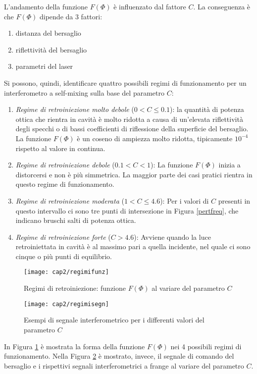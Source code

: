 L'andamento della funzione $F(\Phi)$ è influenzato dal fattore $C$. La conseguenza è che $F(\Phi)$  dipende da 3 fattori:
\begin{enumerate}
	\item distanza del bersaglio
	\item riflettività del bersaglio 
	\item parametri del laser
\end{enumerate}
Si possono, quindi, identificare quattro possibili regimi di funzionamento per un interferometro a self-mixing sulla base del parametro $C$:
\begin{enumerate}
	\item \textit{Regime di retroiniezione molto debole} ($0 < C \leq 0.1$): la quantità di potenza ottica che rientra in cavità è molto ridotta a causa di un'elevata riflettività degli specchi o di bassi coefficienti di riflessione della superficie del bersaglio. La funzione $F(\Phi)$ è un coseno di ampiezza molto ridotta, tipicamente $10^{-4}$ rispetto al valore in continua.
	\item \textit{Regime di retroiniezione debole} ($0.1 < C < 1$): La funzione $F(\Phi)$ inizia a distorcersi e non è più simmetrica. La maggior parte dei casi pratici rientra in questo regime di funzionamento. 
	\item \textit{Regime di retroiniezione moderata} ($1 < C \leq 4.6$): Per i valori di $C$ presenti in questo intervallo ci sono tre punti di intersezione in Figura \ref{pertfreq}, che indicano bruschi salti di potenza ottica.
	\item \textit{Regime di retroiniezione forte} ($C>4.6$): Avviene quando la luce retroiniettata in cavità è al massimo pari a quella incidente, nel quale ci sono cinque o più punti di equilibrio.
\end{enumerate}
\begin{figure}  
  \begin{center}
    \texttt{[image: cap2/regimifunz]}
    \caption{Regimi di retroiniezione: funzione $F(\Phi)$ al variare del parametro $C$}
    \label{regimifunz}
  \end{center}
\end{figure}
\begin{figure}  
  \begin{center}
    \texttt{[image: cap2/regimisegn]}
    \caption{Esempi di segnale interferometrico per i differenti valori del parametro $C$}
    \label{regimisegn}
  \end{center}
\end{figure}
In Figura \ref{regimifunz} è mostrata la forma della funzione $F(\Phi)$ nei 4 possibili regimi di funzionamento. Nella Figura \ref{regimisegn} è mostrato, invece, il segnale di comando del bersaglio e i rispettivi segnali interferometrici a frange al variare del parametro $C$.

